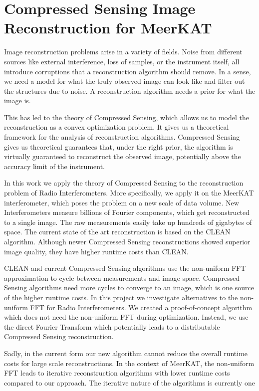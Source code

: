 \section{Compressed Sensing Image Reconstruction for MeerKAT} \label{intro}
Image reconstruction problems arise in a variety of fields. Noise from different sources like external interference, loss of samples, or the instrument itself, all introduce corruptions that a reconstruction algorithm should remove. In a sense, we need a model for what the truly observed image can look like and filter out the structures due to noise. A reconstruction algorithm needs a prior for what the image is. 

This has led to the theory of Compressed Sensing\cite{candes2006robust, donoho2006compressed}, which allows us to model the reconstruction as a convex optimization problem. It gives us a theoretical framework for the analysis of reconstruction algorithms. Compressed Sensing gives us theoretical guarantees that, under the right prior, the algorithm is virtually guaranteed to reconstruct the observed image, potentially above the accuracy limit of the instrument.

In this work we apply the theory of Compressed Sensing to the reconstruction problem of Radio Interferometers. More specifically, we apply it on the MeerKAT interferometer, which poses the problem on a new scale of data volume. New Interferometers measure billions of Fourier components, which get reconstructed to a single image. The raw measurements easily take up hundreds of gigabytes of space. The current state of the art reconstruction is based on the CLEAN\cite{rich2008multi, rau2011multi} algorithm. Although newer Compressed Sensing reconstructions showed superior image quality\cite{girard2015sparse, dabbech2018cygnus}, they have higher runtime costs than CLEAN.

CLEAN and current Compressed Sensing algorithms use the non-uniform FFT approximation to cycle between measurements and image space. Compressed Sensing algorithms need more cycles to converge to an image, which is one source of the higher runtime costs. In this project we investigate alternatives to the non-uniform FFT for Radio Interferometers. We created a proof-of-concept algorithm which does not need the non-uniform FFT during optimization. Instead, we use the direct Fourier Transform which potentially leads to a distributable Compressed Sensing reconstruction.

Sadly, in the current form our new algorithm cannot reduce the overall runtime costs for large scale reconstructions. In the context of MeerKAT, the non-uniform FFT leads to iterative reconstruction algorithms with lower runtime costs compared to our approach. The iterative nature of the algorithms is currently one 

